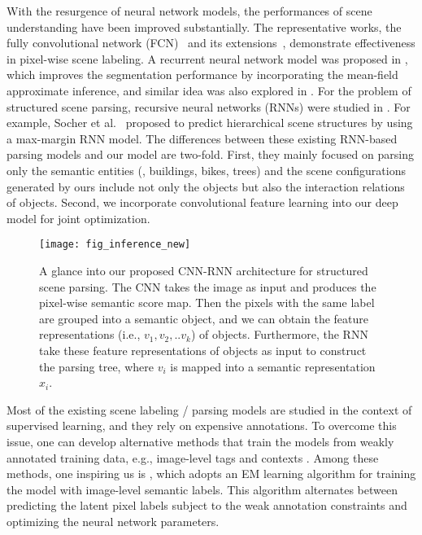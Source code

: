 \documentclass[10pt,twocolumn,letterpaper]{article}
\begin{document}
With the resurgence of neural network models, the performances of scene understanding have been improved substantially. The representative works, the fully convolutional network (FCN)~\cite{DBLP:FCnetwork} and its extensions~\cite{DBLP:CNN-CRF}, demonstrate effectiveness in pixel-wise scene labeling. A recurrent neural network model was proposed in \cite{DBLP:CRF-RNN}, which improves the segmentation performance by incorporating the mean-field approximate inference, and similar idea was also explored in \cite{DBLP:CNN-MRF}. For the problem of structured scene parsing, recursive neural networks (RNNs) were studied in \cite{DBLP:Recursive_Socher}\cite{DBLP:RecursiveContext2}. For example, Socher et al.~\cite{DBLP:Recursive_Socher} proposed to predict hierarchical scene structures by using a max-margin RNN model. The differences between these existing RNN-based parsing models and our model are two-fold. First, they mainly focused on parsing only the semantic entities (\eg, buildings, bikes, trees) and the scene configurations generated by ours include not only the objects but also the interaction relations of objects. Second, we incorporate convolutional feature learning into our deep model for joint optimization.




\begin{figure*}[t!]
\centering
\texttt{[image: fig\_inference\_new]}
\caption{A glance into our proposed CNN-RNN architecture for structured scene parsing. The CNN takes the image as input and produces the pixel-wise semantic score map. Then the pixels with the same label are grouped into a semantic object, and we can obtain the feature representations (i.e., $v_1, v_2,..v_k$) of objects. Furthermore, the RNN take these feature representations of objects as input to construct the parsing tree, where $v_i$ is mapped into a semantic representation $x_i$.}
\label{fig:inference}
\vspace{-2mm}
\end{figure*}

Most of the existing scene labeling / parsing models are studied in the context of supervised learning, and they rely on expensive annotations. To overcome this issue, one can develop alternative methods that train the models from weakly annotated training data, e.g., image-level tags and contexts \cite{DBLP:Weakly2}\cite{DBLP:Weakly-MultiInstance}\cite{DBLP:WeaklySegmentation}. Among these methods, one inspiring us is \cite{DBLP:WeaklySegmentation}, which adopts an EM learning algorithm for training the model with image-level semantic labels. This algorithm alternates between predicting the latent pixel labels subject to the weak annotation constraints and optimizing the neural network parameters.
\end{document}
